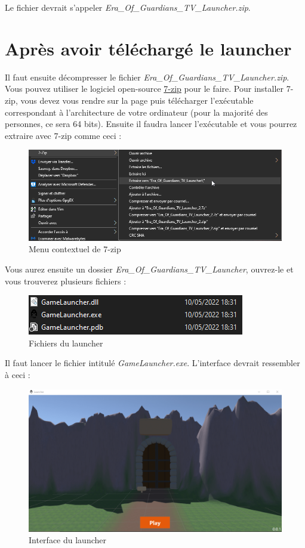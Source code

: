 \documentclass[a4paper, 10pt]{article}
\begin{document}
	Le fichier devrait s'appeler \textit{Era\_Of\_Guardians\_TV\_Launcher.zip}.
	
	\section{Après avoir téléchargé le launcher}
	Il faut ensuite décompresser le fichier \textit{Era\_Of\_Guardians\_TV\_Launcher.zip}. Vous pouvez utiliser le logiciel open-source \href{https://www.7-zip.fr/}{7-zip} pour le faire. Pour installer 7-zip, vous devez vous rendre sur la page puis télécharger l'exécutable correspondant à l'architecture de votre ordinateur (pour la majorité des personnes, ce sera 64 bits). Ensuite il faudra lancer l'exécutable et vous pourrez extraire avec 7-zip comme ceci :
	
	\begin{figure}[ht]
		\centering
		\includegraphics[scale=0.6]{images/7zip_menu.png}
		\caption{Menu contextuel de 7-zip}
	\end{figure}
	
	Vous aurez ensuite un dossier \textit{Era\_Of\_Guardians\_TV\_Launcher}, ouvrez-le et vous trouverez plusieurs 
	fichiers : 
	
	\begin{figure}[ht]
		\centering
		\includegraphics[scale=0.8]{images/fichiers.png}
		\caption{Fichiers du launcher}
	\end{figure}

	Il faut lancer le fichier intitulé \textit{GameLauncher.exe}. L'interface devrait ressembler à ceci :
	\clearpage
	\begin{figure}[ht]
		\centering
		\includegraphics[scale=0.4]{images/launcher.png}
		\caption{Interface du launcher}
	\end{figure}
\end{document}
